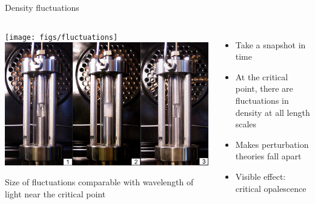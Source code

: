\documentclass[xcolor=dvipsnames]{beamer}
\begin{document}
\begin{frame}{Density fluctuations}
  \begin{columns}[T]
  \begin{overprint}
    \texttt{[image: figs/fluctuations]}
    \includegraphics[width=\columnwidth]{figs/critical-opalescence}

    Size of fluctuations comparable with wavelength of light near the critical point
  \end{overprint}

  \begin{itemize}
    \item Take a snapshot in time
    \item At the critical point, there are fluctuations in density at all length scales
    \item Makes perturbation theories fall apart
    \item Visible effect: critical opalescence
  \end{itemize}
  \end{columns}
\end{frame}
\end{document}
